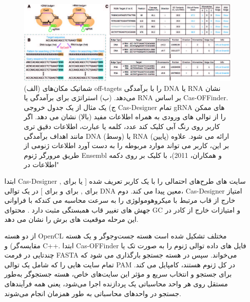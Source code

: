 \documentclass[12pt,a4paper,BCOR=.7cm,headsepline,bibliography=totoc]{report}
\begin{document}
\begin{figure}[!h]
\centering
\includegraphics[width=16cm, ]{pictures/Cas-Designer.jpg}
\caption{
(الف) شماتیک مکان‌های off-tagets را با برآمدگی DNA یا RNA نشان می‌دهد. (ب) استراتژی برای  برآمدگی  یا RNA بر اساس Cas-OFFinder. ج) یک مثال
از یک جدول خروجی Cas-Designer تمام gRNA های ممکن را از توالی های ورودی به همراه اطلاعات مفید (بالا) نشان می دهد. اگر کاربر روی رنگ آبی کلیک کند
عدد، کلمه یا عبارت، اطلاعات دقیق تری مانند اهداف برآمدگی DNA (وسط) یا RNA (پایین) ارائه می شود. علاوه بر این، کاربر می تواند موارد مربوطه را به دست آورد
اطلاعات ژنومی از طریق مرورگر ژنوم Ensembl  و همکاران، 2011)، با کلیک بر روی دکمه "اطلاعات در 
}\label{fig:4}
\end{figure}

ابتدا Cas-Designer سایت های طرح‌های احتمالی را با یک کاربر تعریف شده [ یا  برای ,  برای ,  برای  و  برای ] در یک توالی DNA معین  پیدا می کند. دوم، Cas-Designer
امتیاز خارج از قاب مرتبط با میکروهومولوژی را به سرعت محاسبه می کندکه با فراوانی جهش های تغییر قاب همبستگی مثبت دارد . محتوای GC و امتیازات خارج از کادر در این مرحله موقعیت های برش را نشان می دهد.

 از دو هسته OpenCL مختلف تشکیل شده است
هسته جست‌وجوگر و یک هسته مقایسه‌گر) و C++. ابتدا Cas-OFFinder فایل های داده توالی ژنوم را به صورت تک یا چندتایی در فرمت FASTA می‌خواند. سپس در هسته جستجو بارگذاری می شود که تمام سایت هایی را که شامل یک توالی PAM در کل ژنوم هستند، کامپایل می کند. برای جستجو و انتخاب سریع و مؤثر این سایت‌های خاص، هسته جستجوگر به‌طور مستقل روی هر واحد محاسباتی یک پردازنده اجرا می‌شود، یعنی همه فرآیندهای جستجو در واحدهای محاسباتی به طور همزمان انجام می‌شوند.
\end{document}
